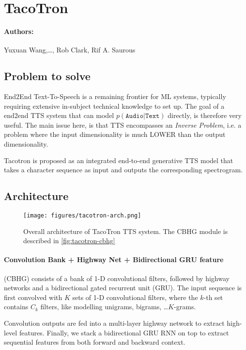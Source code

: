 \section{TacoTron}
\paragraph{Authors:} Yuxuan Wang,\dots , Rob Clark, Rif A. Saurous \cite{wang_tacotron_2017}


\subsection{Problem to solve}
End2End Text-To-Speech is a remaining frontier for ML systems, typically requiring extensive in-subject technical knowledge to set up. 
The goal of a end2end TTS system that can model \(p(\mathtt{Audio}|\mathtt{Text})\) directly, is therefore very useful. 
The main issue here, is that TTS encompasses an \textit{Inverse Problem}, i.e. a problem where the input dimensionality is much LOWER than the output dimensionality. 

Tacotron is proposed as an integrated end-to-end generative TTS model that takes a character sequence as input and outputs the corresponding spectrogram. 

\subsection{Architecture}
\begin{figure}[h!]
    \centering
    \texttt{[image: figures/tacotron-arch.png]}
    \caption{Overall architecture of TacoTron TTS system. 
    The CBHG module is described in \cref{fig:tacotron-cbhg}}
    \label{fig:tacotron-arch}
\end{figure}


\paragraph{Convolution Bank + Highway Net + Bidirectional GRU feature}
(CBHG) consists of a bank of 1-D convolutional filters, followed by highway networks and a bidirectional gated recurrent unit (GRU). 
The input sequence is first convolved with 
\(K\) sets of 1-D convolutional filters, where the $k$-th set contains $C_k$ filters, like modelling unigrams, bigrams, \dots $K$-grams.  

Convolution outputs are fed into a multi-layer highway network to extract high-level features. 
Finally, we stack a bidirectional GRU RNN on top to extract sequential features from both forward and backward context.

